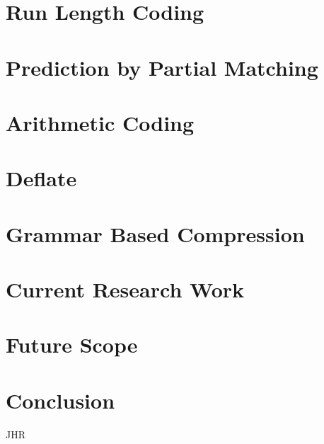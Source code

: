 \documentclass{article}
\begin{document}
\section{Run Length Coding}

\section{Prediction by Partial Matching}

\section{Arithmetic Coding}

\section{Deflate}

\section{Grammar Based Compression}

\section{Current Research Work}

\section{Future Scope}

\section{Conclusion}
JHR \\



\end{document}
